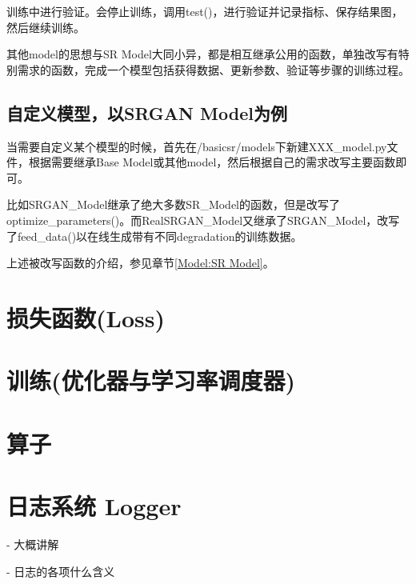 \documentclass[../main.tex]{subfiles}
\begin{document}
训练中进行验证。会停止训练，调用test()，进行验证并记录指标、保存结果图，然后继续训练。

其他model的思想与SR Model大同小异，都是相互继承公用的函数，单独改写有特别需求的函数，完成一个模型包括获得数据、更新参数、验证等步骤的训练过程。


\subsection{自定义模型，以SRGAN Model为例}

当需要自定义某个模型的时候，首先在/basicsr/models下新建XXX\_model.py文件，根据需要继承Base Model或其他model，然后根据自己的需求改写主要函数即可。

比如SRGAN\_Model继承了绝大多数SR\_Model的函数，但是改写了optimize\_parameters()。而RealSRGAN\_Model又继承了SRGAN\_Model，改写了feed\_data()以在线生成带有不同degradation的训练数据。

\begin{note} %
	上述被改写函数的介绍，参见章节\ref{Model:SR Model}。
\end{note}



\section{损失函数(Loss)}

\section{训练(优化器与学习率调度器)}

\section{算子}

\section{日志系统 Logger}

- 大概讲解

- 日志的各项什么含义
\end{document}
